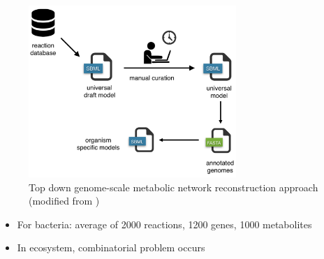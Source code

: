 \documentclass[8pt,usenames,dvipsnames]{beamer}
\begin{document}
\begin{frame}
\begin{minipage}{0.3\textwidth}
\end{minipage}%
\begin{minipage}{0.7\textwidth}
\begin{figure}
\includegraphics[width=0.7\textwidth]{figures/top-down}
\caption{Top down genome-scale metabolic network reconstruction approach \tiny (modified from \cite{Machado2018})}
\end{figure}
\end{minipage}
\vspace{-0.4cm}
\begin{block}{}
\begin{itemize}
\item For bacteria: average of 2000 reactions, 1200 genes, 1000 metabolites
\item In ecosystem, combinatorial problem occurs
\end{itemize}
\end{block}
\end{frame}
\end{document}
